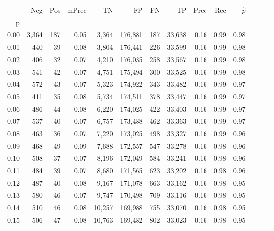 \begin{tabular}{rrrrrrrrrrrrrr}
\toprule
{} &    Neg &    Pos & mPrec &       TN &       FP &      FN &      TP &  Prec &   Rec & $\hat{p}$ \\
p    &        &        &       &          &          &         &         &       &       &           \\
\midrule
0.00 &  3,364 &    187 &  0.05 &    3,364 &  176,881 &     187 &  33,638 &  0.16 &  0.99 &      0.98 \\
0.01 &    440 &     39 &  0.08 &    3,804 &  176,441 &     226 &  33,599 &  0.16 &  0.99 &      0.98 \\
0.02 &    406 &     32 &  0.07 &    4,210 &  176,035 &     258 &  33,567 &  0.16 &  0.99 &      0.98 \\
0.03 &    541 &     42 &  0.07 &    4,751 &  175,494 &     300 &  33,525 &  0.16 &  0.99 &      0.98 \\
0.04 &    572 &     43 &  0.07 &    5,323 &  174,922 &     343 &  33,482 &  0.16 &  0.99 &      0.97 \\
0.05 &    411 &     35 &  0.08 &    5,734 &  174,511 &     378 &  33,447 &  0.16 &  0.99 &      0.97 \\
0.06 &    486 &     44 &  0.08 &    6,220 &  174,025 &     422 &  33,403 &  0.16 &  0.99 &      0.97 \\
0.07 &    537 &     40 &  0.07 &    6,757 &  173,488 &     462 &  33,363 &  0.16 &  0.99 &      0.97 \\
0.08 &    463 &     36 &  0.07 &    7,220 &  173,025 &     498 &  33,327 &  0.16 &  0.99 &      0.96 \\
0.09 &    468 &     49 &  0.09 &    7,688 &  172,557 &     547 &  33,278 &  0.16 &  0.98 &      0.96 \\
0.10 &    508 &     37 &  0.07 &    8,196 &  172,049 &     584 &  33,241 &  0.16 &  0.98 &      0.96 \\
0.11 &    484 &     39 &  0.07 &    8,680 &  171,565 &     623 &  33,202 &  0.16 &  0.98 &      0.96 \\
0.12 &    487 &     40 &  0.08 &    9,167 &  171,078 &     663 &  33,162 &  0.16 &  0.98 &      0.95 \\
0.13 &    580 &     46 &  0.07 &    9,747 &  170,498 &     709 &  33,116 &  0.16 &  0.98 &      0.95 \\
0.14 &    510 &     46 &  0.08 &   10,257 &  169,988 &     755 &  33,070 &  0.16 &  0.98 &      0.95 \\
0.15 &    506 &     47 &  0.08 &   10,763 &  169,482 &     802 &  33,023 &  0.16 &  0.98 &      0.95 \\

\end{tabular}
